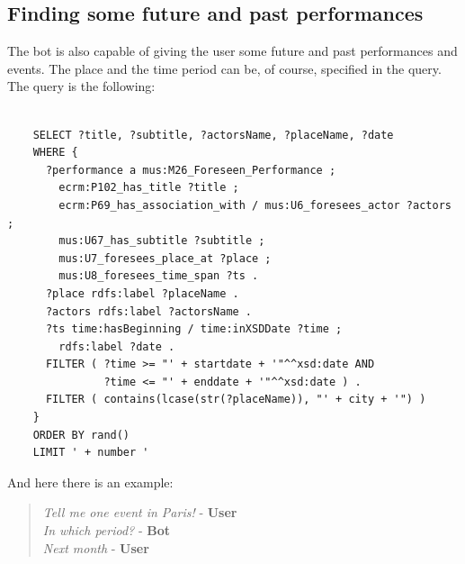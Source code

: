 \documentclass[a4paper,12pt]{report}
\begin{document}
	\subsection{Finding some future and past performances}
	The bot is also capable of giving the user some future and past performances and events. The place and the time period can be, of course, specified in the query. The query is the following:
	\begin{lstlisting}
	
	SELECT ?title, ?subtitle, ?actorsName, ?placeName, ?date
	WHERE {
	  ?performance a mus:M26_Foreseen_Performance ;
	    ecrm:P102_has_title ?title ;
	    ecrm:P69_has_association_with / mus:U6_foresees_actor ?actors ;
	    mus:U67_has_subtitle ?subtitle ;
	    mus:U7_foresees_place_at ?place ;
	    mus:U8_foresees_time_span ?ts .
	  ?place rdfs:label ?placeName .
	  ?actors rdfs:label ?actorsName .
	  ?ts time:hasBeginning / time:inXSDDate ?time ;
 	    rdfs:label ?date .
	  FILTER ( ?time >= "' + startdate + '"^^xsd:date AND
	           ?time <= "' + enddate + '"^^xsd:date ) .
	  FILTER ( contains(lcase(str(?placeName)), "' + city + '") )
	}
	ORDER BY rand()
	LIMIT ' + number '
	\end{lstlisting}
	And here there is an example:
	\begin{verse}
		\textit{Tell me one event in Paris!} - \textbf{User}\\
		\textit{In which period?} - \textbf{Bot}\\
		\textit{Next month} - \textbf{User}\\
	\end{verse}
\end{document}
